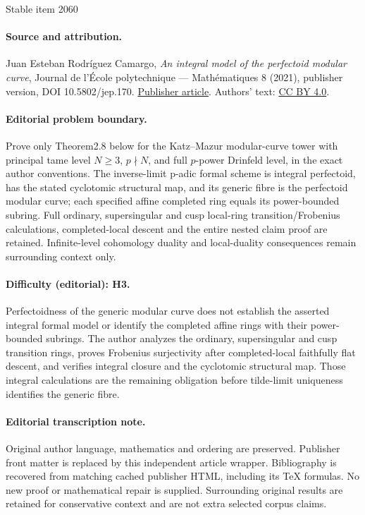 \documentclass[11pt]{article}
\numberwithin{equation}{section}
\theoremstyle{definition}
\begin{document}
\begin{center}{\Large Stable item 2060}\end{center}
\paragraph{Source and attribution.}
Juan Esteban Rodríguez Camargo, \emph{An integral model of the perfectoid modular curve}, Journal de l’École polytechnique — Mathématiques 8 (2021), publisher version, DOI 10.5802/jep.170. \href{https://jep.centre-mersenne.org/articles/10.5802/jep.170/}{Publisher article}. Authors' text: \href{https://creativecommons.org/licenses/by/4.0/}{CC BY 4.0}.
\paragraph{Editorial problem boundary.}
Prove only Theorem2.8 below for the Katz--Mazur modular-curve tower with principal tame level \(N\ge3\), \(p\nmid N\), and full \(p\)-power Drinfeld level, in the exact author conventions. The inverse-limit p-adic formal scheme is integral perfectoid, has the stated cyclotomic structural map, and its generic fibre is the perfectoid modular curve; each specified affine completed ring equals its power-bounded subring. Full ordinary, supersingular and cusp local-ring transition/Frobenius calculations, completed-local descent and the entire nested claim proof are retained. Infinite-level cohomology duality and local-duality consequences remain surrounding context only.
\paragraph{Difficulty (editorial): H3.}
Perfectoidness of the generic modular curve does not establish the asserted integral formal model or identify the completed affine rings with their power-bounded subrings. The author analyzes the ordinary, supersingular and cusp transition rings, proves Frobenius surjectivity after completed-local faithfully flat descent, and verifies integral closure and the cyclotomic structural map. Those integral calculations are the remaining obligation before tilde-limit uniqueness identifies the generic fibre.
\paragraph{Editorial transcription note.}
Original author language, mathematics and ordering are preserved. Publisher front matter is replaced by this independent article wrapper. Bibliography is recovered from matching cached publisher HTML, including its TeX formulas. No new proof or mathematical repair is supplied. Surrounding original results are retained for conservative context and are not extra selected corpus claims.
\clearpage
\end{document}

